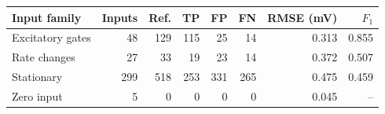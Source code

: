 \begin{tabular}{lrrrrrrr}
\toprule
Input family & Inputs & Ref. & TP & FP & FN & RMSE (mV) & $F_1$\\
\midrule
Excitatory gates & 48 & 129 & 115 & 25 & 14 & 0.313 & 0.855 \\
Rate changes & 27 & 33 & 19 & 23 & 14 & 0.372 & 0.507 \\
Stationary & 299 & 518 & 253 & 331 & 265 & 0.475 & 0.459 \\
Zero input & 5 & 0 & 0 & 0 & 0 & 0.045 & -- \\
\bottomrule
\end{tabular}
